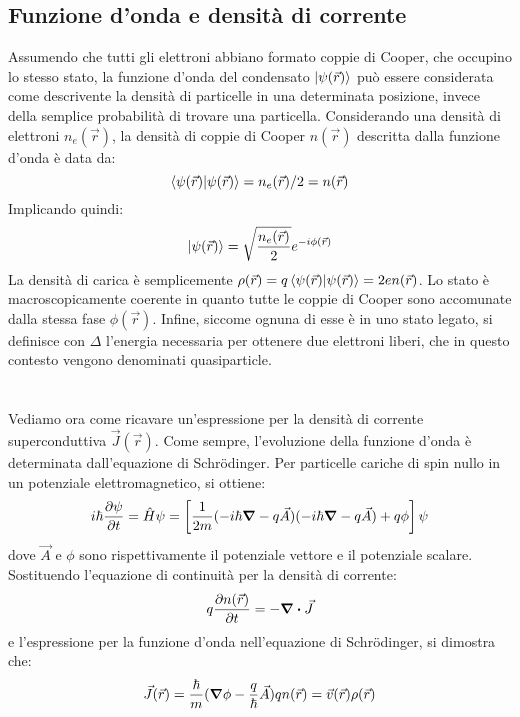 \subsection{Funzione d'onda e densità di corrente}
Assumendo che tutti gli elettroni abbiano formato coppie di Cooper, che occupino lo stesso stato, la funzione d'onda del condensato $\ket{\psi(\vec r)}$ può essere considerata come descrivente la densità di particelle in una determinata posizione, invece della semplice probabilità di trovare una particella. Considerando una densità di elettroni $n_e(\vec{r})$, la densità di coppie di Cooper $n(\vec{r})$ descritta dalla funzione d'onda è data da:
\begin{equation*}
    \ip{\psi(\vec r)}{\psi(\vec r)} = n_e(\vec{r})/2=n(\vec{r})
\end{equation*}
Implicando quindi:
\begin{equation*}
    \ket{\psi(\vec r)} = \sqrt{\frac{n_e(\vec{r})}{2}}e^{-i\phi(\vec{r})}
\end{equation*}
La densità di carica è semplicemente $\rho(\vec r)=q\ip{\psi(\vec r)}{\psi(\vec r)}=2en(\vec{r})$. Lo stato è macroscopicamente coerente in quanto tutte le coppie di Cooper sono accomunate dalla stessa fase $\phi(\vec{r})$. Infine, siccome ognuna di esse è in uno stato legato, si definisce con $\Delta$ l'energia necessaria per ottenere due elettroni liberi, che in questo contesto vengono denominati quasiparticle.\\
\\ \noindent
{}
\noindent
\\
Vediamo ora come ricavare un'espressione per la densità di corrente superconduttiva $\vec J(\vec r)$. Come sempre, l'evoluzione della funzione d'onda è determinata dall'equazione di Schrödinger. Per particelle cariche di spin nullo in un potenziale elettromagnetico, si ottiene:
\begin{equation*}
    i\hbar\partialderivative{\psi}{t}=\hat H\psi=\left[\frac{1}{2m}(-i\hbar\grad-q\vec{A})(-i\hbar\grad-q\vec{A})+q\phi\right]\psi
\end{equation*}
dove $\vec{A}$ e $\phi$ sono rispettivamente il potenziale vettore e il potenziale scalare. Sostituendo l'equazione di continuità per la densità di corrente:
\begin{equation*}
    q\partialderivative{n(\vec r)}{t}= -\div \vec J
\end{equation*}
e l'espressione per la funzione d'onda nell'equazione di Schrödinger, si dimostra che:
\begin{equation}
    \vec J(\vec r)=\frac{\hbar}{m}(\grad\phi-\frac{q}{\hbar}\vec A)qn(\vec r)=\vec v(\vec r)\rho(\vec r)
    \label{current_density}
\end{equation}

